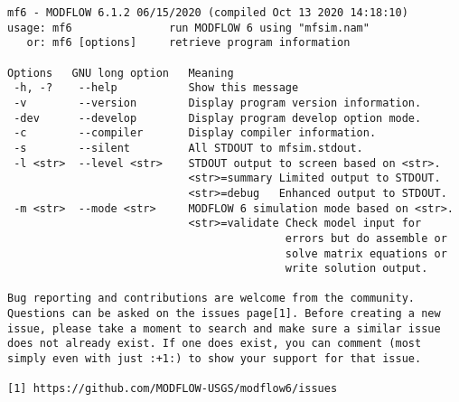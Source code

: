 {\small
\begin{lstlisting}[style=modeloutput]
mf6 - MODFLOW 6.1.2 06/15/2020 (compiled Oct 13 2020 14:18:10)
usage: mf6               run MODFLOW 6 using "mfsim.nam"
   or: mf6 [options]     retrieve program information

Options   GNU long option   Meaning 
 -h, -?    --help           Show this message
 -v        --version        Display program version information.
 -dev      --develop        Display program develop option mode.
 -c        --compiler       Display compiler information.
 -s        --silent         All STDOUT to mfsim.stdout.
 -l <str>  --level <str>    STDOUT output to screen based on <str>.
                            <str>=summary Limited output to STDOUT.
                            <str>=debug   Enhanced output to STDOUT.
 -m <str>  --mode <str>     MODFLOW 6 simulation mode based on <str>.
                            <str>=validate Check model input for
                                           errors but do assemble or
                                           solve matrix equations or
                                           write solution output.
                                                                    
Bug reporting and contributions are welcome from the community. 
Questions can be asked on the issues page[1]. Before creating a new
issue, please take a moment to search and make sure a similar issue
does not already exist. If one does exist, you can comment (most
simply even with just :+1:) to show your support for that issue.
                                                                    
[1] https://github.com/MODFLOW-USGS/modflow6/issues
\end{lstlisting}
}
